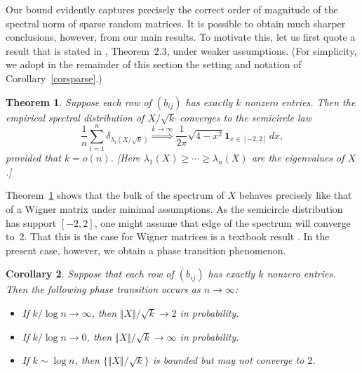 \documentclass[aop,MSNbibl,dvips]{arximspdf}
\newcommand{\rrVert}{\Vert}
\newcommand{\llVert}{\Vert}
\newtheorem{teo}{Theorem}[section]
\newtheorem{cor}[teo]{Corollary}
\begin{document}
Our bound evidently captures precisely the correct order of magnitude of
the spectral norm of sparse random matrices. It is possible to obtain
much sharper conclusions, however, from our main results. To motivate
this, let us first quote a result that is stated in \cite{BGP14},
Theorem~2.3, under weaker assumptions. (For simplicity, we adopt in the
remainder of this section the setting and notation of
Corollary~\ref{corsparse}.)

%
\begin{teo}
\label{teobulk}
Suppose each row of $(b_{ij})$ has exactly $k$ nonzero entries.
Then the empirical spectral distribution of $X/\sqrt{k}$ converges
to the semicircle law
%
\[
\frac{1}{n}\sum_{i=1}^n
\delta_{\lambda_i(X/\sqrt{k})} \stackrel{k\to\infty} {\Longrightarrow}
\frac{1}{2\pi}
\sqrt{4-x^2} \mathbf{1}_{x\in[-2,2]} \,dx, %
\]
%
provided that $k=o(n)$.
[Here $\lambda_1(X)\ge\cdots\ge\lambda_n(X)$ are the eigenvalues of
$X$.]
\end{teo}

Theorem~\ref{teobulk} shows that the bulk of the spectrum of $X$ behaves
precisely like that of a Wigner matrix under minimal assumptions. As the
semicircle distribution has support $[-2,2]$, one might assume that edge
of the spectrum will converge to~$2$. That this is the case for Wigner
matrices is a textbook result \cite{AGZ10}. In the present case, however,
we obtain a phase transition phenomenon.

%
\begin{cor}
\label{corphtr}
Suppose that each row of $(b_{ij})$ has exactly $k$ nonzero entries.
Then the following phase transition occurs as
$n\to\infty$:
%
\begin{itemize}
%
\item If $k/\log n\to\infty$, then $\llVert X\rrVert /\sqrt{k}\to2$
in probability.
%
\item If $k/\log n\to0$, then $\llVert X\rrVert /\sqrt{k}\to\infty$
in probability.
%
\item If $k\sim\log n$, then $\{\llVert X\rrVert /\sqrt{k}\}$ is bounded
but may not converge to $2$.
\end{itemize}
%
\end{cor}
\end{document}
